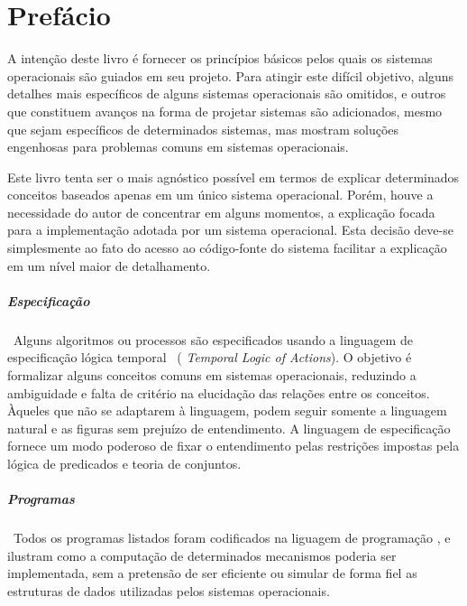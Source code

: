 

\chapter*{Prefácio}
\label{ch:preface}

A intenção deste livro é fornecer os princípios básicos pelos quais os
sistemas operacionais são guiados em seu projeto. Para atingir este
difícil objetivo, alguns detalhes mais específicos de alguns sistemas
operacionais são omitidos, e outros que constituem avanços na forma de
projetar sistemas são adicionados, mesmo que sejam específicos de
determinados sistemas, mas mostram soluções engenhosas para problemas
comuns em sistemas operacionais.

 Este livro tenta ser o mais agnóstico possível em termos de explicar
 determinados conceitos baseados apenas em um único sistema
 operacional. Porém, houve a necessidade do autor de concentrar em
 alguns momentos, a explicação focada para a implementação adotada por
 um sistema operacional. Esta decisão deve-se simplesmente ao fato do
 acesso ao código-fonte do sistema facilitar a explicação em um nível
 maior de detalhamento.

\paragraph{Especificação}~Alguns algoritmos ou processos são especificados
   usando a linguagem de especificação lógica temporal \TLAPLUS~({\it
     Temporal Logic of Actions\/}). O objetivo é formalizar alguns
   conceitos comuns em sistemas operacionais, reduzindo a ambiguidade
   e falta de critério na elucidação das relações entre os
   conceitos. Àqueles que não se adaptarem à linguagem, podem seguir
   somente a linguagem natural e as figuras sem prejuízo de
   entendimento. A linguagem de especificação fornece um modo poderoso
   de fixar o entendimento pelas restrições impostas pela lógica de
   predicados e teoria de conjuntos.

\paragraph{Programas}~Todos os programas listados foram codificados na
   liguagem de programação \CEE, e ilustram como a computação de
   determinados mecanismos poderia ser implementada, sem a pretensão
   de ser eficiente ou simular de forma fiel as estruturas de dados
   utilizadas pelos sistemas operacionais.
